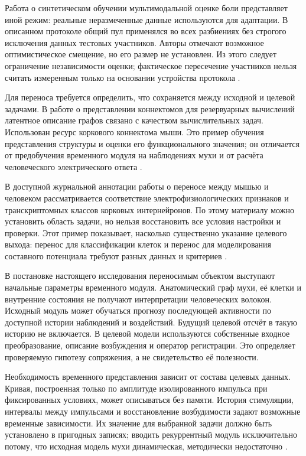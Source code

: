 Работа о синтетическом обучении мультимодальной оценке боли представляет иной режим: реальные неразмеченные данные используются для адаптации. В описанном протоколе общий пул применялся во всех разбиениях без строгого исключения данных тестовых участников. Авторы отмечают возможное оптимистическое смещение, но его размер не установлен. Из этого следует ограничение независимости оценки; фактическое пересечение участников нельзя считать измеренным только на основании устройства протокола \cite{s149}.

Для переноса требуется определить, что сохраняется между исходной и целевой задачами. В работе о представлении коннектомов для резервуарных вычислений латентное описание графов связано с качеством вычислительных задач. Использован ресурс коркового коннектома мыши. Это пример обучения представления структуры и оценки его функционального значения; он отличается от предобучения временного модуля на наблюдениях мухи и от расчёта человеческого электрического ответа \cite{s892}.

В доступной журнальной аннотации работы о переносе между мышью и человеком рассматривается соответствие электрофизиологических признаков и транскриптомных классов корковых интернейронов. По этому материалу можно установить область задачи, но нельзя восстановить все условия настройки и проверки. Этот пример показывает, насколько существенно указание целевого выхода: перенос для классификации клеток и перенос для моделирования составного потенциала требуют разных данных и критериев \cite{s873}.

В постановке настоящего исследования переносимым объектом выступают начальные параметры временного модуля. Анатомический граф мухи, её клетки и внутренние состояния не получают интерпретации человеческих волокон. Исходный модуль может обучаться прогнозу последующей активности по доступной истории наблюдений и воздействий. Будущий целевой отсчёт в такую историю не включается. В целевой модели используются собственные входное преобразование, описание возбуждения и оператор регистрации. Это определяет проверяемую гипотезу сопряжения, а не свидетельство её полезности.

Необходимость временного представления зависит от состава целевых данных. Кривая, построенная только по амплитуде изолированного импульса при фиксированных условиях, может описываться без памяти. История стимуляции, интервалы между импульсами и восстановление возбудимости задают возможные временные зависимости. Их значение для выбранной задачи должно быть установлено в пригодных записях; вводить рекуррентный модуль исключительно потому, что исходная модель мухи динамическая, методически недостаточно \cite{posture,s789,s876,s877}.

